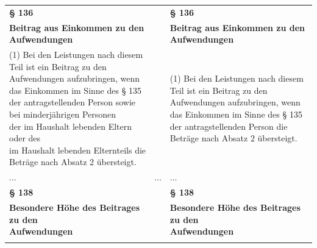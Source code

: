 \documentclass[10pt,a4paper,landscape]{article}
\begin{document}
\begin{longtable}{|L{8.2cm}|L{8.2cm}|L{8.2cm}|}
\hhline{|---|}
\textbf{\S{} 136} &  & \textbf{\S{} 136} \\
\hhline{|---|}
\textbf{Beitrag aus Einkommen zu den  \newline Aufwendungen} &  & \textbf{Beitrag aus Einkommen zu den  \newline Aufwendungen} \\
\hhline{|---|}
(1) Bei den Leistungen nach diesem Teil ist  \newline ein Beitrag zu den Aufwendungen  \newline aufzubringen, wenn das Einkommen im  \newline Sinne des \S{} 135 der antragstellenden  \newline Person \textcolor{diffred}{sowie bei minderjährigen Personen  \newline der im Haushalt lebenden Eltern oder des  \newline im Haushalt lebenden Elternteils} die  \newline Beträge nach Absatz 2 übersteigt. &  & (1) Bei den Leistungen nach diesem Teil ist  \newline ein Beitrag zu den Aufwendungen  \newline aufzubringen, wenn das Einkommen im  \newline Sinne des \S{} 135 der antragstellenden  \newline Person  die  \newline Beträge nach Absatz 2 übersteigt. \\
\hhline{|---|}
... & ... & ... \\
\hhline{|---|}
\textbf{\S{} 138} &  & \textbf{\S{} 138} \\
\hhline{|---|}
\textbf{Besondere Höhe des Beitrages zu den  \newline Aufwendungen} &  & \textbf{Besondere Höhe des Beitrages zu den  \newline Aufwendungen} \\
\hhline{|---|}

\end{longtable}
\end{document}
